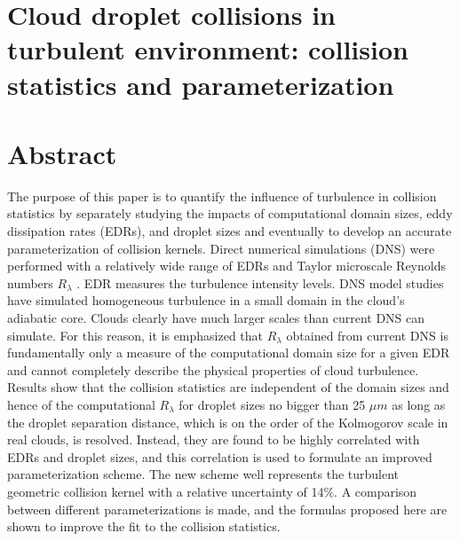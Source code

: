 \section*{\centering Cloud droplet collisions in turbulent environment: collision statistics and parameterization}
\begin{center}
\author{Sisi Chen, Peter Bartello, M. K. Yau \\ \textit{Department of Atmospheric and Oceanic Sciences, McGill University, Montr\'{e}al, Qu\'{e}bec, Canada}\\ 
\and P.V. Vaillancourt \\ \textit{Meteorological Research Division, Environment and Climate Change Canada, Dorval, Qu\'{e}bec, Canada} \\}
\author{Kevin Zwijsen \\ \textit{Department of Atmospheric and Oceanic Sciences, McGill University, Montr\'{e}al, Qu\'{e}bec, Canada}}

\end{center}

\section*{\centering Abstract}
The purpose of this paper is to quantify the influence of turbulence in collision statistics by separately studying the impacts of computational domain sizes, eddy dissipation rates (EDRs), and droplet sizes and eventually to develop an accurate parameterization of collision kernels. Direct numerical simulations (DNS) were performed with a relatively wide range of EDRs and Taylor microscale Reynolds numbers $R_\lambda$ . EDR measures the turbulence intensity levels. DNS model studies have simulated homogeneous turbulence in a small domain in the cloud's adiabatic core. Clouds clearly have much larger scales than current DNS can simulate. For this reason, it is emphasized that $R_\lambda$ obtained from current DNS is fundamentally only a measure of the computational domain size for a given EDR and cannot completely describe the physical properties of cloud turbulence. Results show that the collision statistics are independent of the domain sizes and hence of the computational $R_\lambda$ for droplet sizes no bigger than 25 $\mu m$ as long as the droplet separation distance, which is on the order of the Kolmogorov scale in real clouds, is resolved. Instead, they are found to be highly correlated with EDRs and droplet sizes, and this correlation is used to formulate an improved parameterization scheme. The new scheme well represents the turbulent geometric collision kernel with a relative uncertainty of 14\%. A comparison between different parameterizations is made, and the formulas proposed here are shown to improve the fit to the collision statistics.

